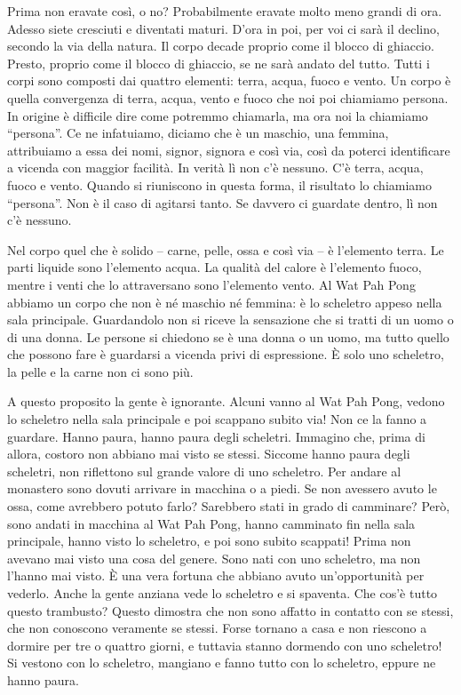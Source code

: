 Prima non eravate così, o no? Probabilmente eravate molto meno grandi di
ora. Adesso siete cresciuti e diventati maturi. D'ora in poi, per voi ci
sarà il declino, secondo la via della natura. Il corpo decade proprio
come il blocco di ghiaccio. Presto, proprio come il blocco di ghiaccio,
se ne sarà andato del tutto. Tutti i corpi sono composti dai quattro
elementi: terra, acqua, fuoco e vento. Un corpo è quella convergenza di
terra, acqua, vento e fuoco che noi poi chiamiamo persona. In origine è
difficile dire come potremmo chiamarla, ma ora noi la chiamiamo
``persona''. Ce ne infatuiamo, diciamo che è un maschio, una femmina,
attribuiamo a essa dei nomi, signor, signora e così via, così da poterci
identificare a vicenda con maggior facilità. In verità lì non c'è
nessuno. C'è terra, acqua, fuoco e vento. Quando si riuniscono in questa
forma, il risultato lo chiamiamo ``persona''. Non è il caso di agitarsi
tanto. Se davvero ci guardate dentro, lì non c'è nessuno.

Nel corpo quel che è solido -- carne, pelle, ossa e così via -- è
l'elemento terra. Le parti liquide sono l'elemento acqua. La qualità del
calore è l'elemento fuoco, mentre i venti che lo attraversano sono
l'elemento vento. Al Wat Pah Pong abbiamo un corpo che non è né maschio
né femmina: è lo scheletro appeso nella sala principale. Guardandolo non
si riceve la sensazione che si tratti di un uomo o di una donna. Le
persone si chiedono se è una donna o un uomo, ma tutto quello che
possono fare è guardarsi a vicenda privi di espressione. È solo uno
scheletro, la pelle e la carne non ci sono più.

A questo proposito la gente è ignorante. Alcuni vanno al Wat Pah Pong,
vedono lo scheletro nella sala principale e poi scappano subito via! Non
ce la fanno a guardare. Hanno paura, hanno paura degli scheletri.
Immagino che, prima di allora, costoro non abbiano mai visto se stessi.
Siccome hanno paura degli scheletri, non riflettono sul grande valore di
uno scheletro. Per andare al monastero sono dovuti arrivare in macchina
o a piedi. Se non avessero avuto le ossa, come avrebbero potuto farlo?
Sarebbero stati in grado di camminare? Però, sono andati in macchina al
Wat Pah Pong, hanno camminato fin nella sala principale, hanno visto lo
scheletro, e poi sono subito scappati! Prima non avevano mai visto una
cosa del genere. Sono nati con uno scheletro, ma non l'hanno mai visto.
È una vera fortuna che abbiano avuto un'opportunità per vederlo. Anche
la gente anziana vede lo scheletro e si spaventa. Che cos'è tutto questo
trambusto? Questo dimostra che non sono affatto in contatto con se
stessi, che non conoscono veramente se stessi. Forse tornano a casa e
non riescono a dormire per tre o quattro giorni, e tuttavia stanno
dormendo con uno scheletro! Si vestono con lo scheletro, mangiano e
fanno tutto con lo scheletro, eppure ne hanno paura.

